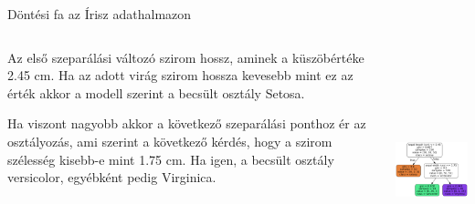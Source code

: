 \documentclass[english, aspectratio=169]{beamer}
\begin{document}
\begin{frame}{Döntési fa az Írisz adathalmazon}
\begin{columns}
\begin{column}{.5\textwidth}
Az első szeparálási változó szirom hossz, aminek a küszöbértéke 2.45 cm. Ha az adott virág szirom hossza kevesebb mint ez az érték akkor a modell szerint a becsült osztály Setosa.\par\smallskip
Ha viszont nagyobb akkor a következő szeparálási ponthoz ér az osztályozás, ami szerint a következő kérdés, hogy a szirom szélesség kisebb-e mint 1.75 cm. Ha igen, a becsült osztály versicolor, egyébként pedig Virginica.
\end{column}
\begin{column}{.5\textwidth}
\begin{center}
\includegraphics[width=7cm, height=7cm, keepaspectratio]{graphs/decision_trees_4.png}
\end{center}
\end{column}
\end{columns}
\end{frame}
\end{document}
